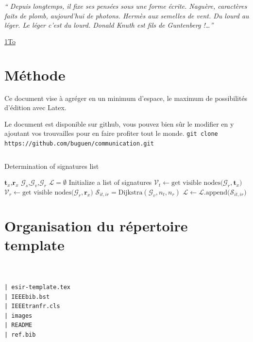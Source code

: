 \documentclass[twocolumn,a4paper]{IEEEtranfr}
\newcommand{\mc}[1]{\mathcal{#1}}
\begin{document}
{\textit
{`` Depuis longtemps, il fixe ses pensées sous une forme écrite.
Naguère, caractères faits de plomb, aujourd'hui de photons. Hermès aux semelles de vent. Du lourd au léger. Le léger c'est du lourd. 
Donald Knuth est fils de Guntenberg !\dots''}

\href{http://micro.lemondeinformatique.fr/nouveaux-produits/lire-datatraveler-hyperx-predator-19600.html}{1To}
\section{Méthode}

Ce document vise à agréger en un minimum d'espace, le maximum de possibilités
d'édition avec Latex.

Le document est disponible sur github,  vous pouvez bien sûr le modifier en y ajoutant
vos trouvailles pour en faire profiter tout le monde.
{\tt git clone https://github.com/buguen/communication.git}
\begin{lstlisting}

\end{lstlisting}

\begin{algorithm}               %
\label{alg1}                           %
\caption{Determination of signatures list}
\begin{algorithmic}                    %
\REQUIRE $\mathbf{t}_x$,$\mathbf{r}_x$
\REQUIRE $\mc{G}_s$,$\mc{G}_v$,$\mc{G}_r$
\STATE $\mathcal{L} = \emptyset $ Initialize a list of signatures
\STATE $\mathcal{V}_t \leftarrow \textrm{get visible nodes(}\mc{G}_r,\mathbf{t}_x\textrm{)}$
\STATE $\mathcal{V}_r \leftarrow \textrm{get visible nodes(}\mc{G}_r,\mathbf{r}_x\textrm{)}$
\STATE $\mc{S}_{it,ir}  = \textrm{Dijkstra}(\mc{G}_v,n_t,n_r)$
\STATE $\mathcal{L}\leftarrow \mathcal{L}.\textrm{append(}\mc{S}_{it,ir}\textrm{)}$
\ENDFOR
\ENDFOR
\end{algorithmic}
\end{algorithm}

\section{Organisation du répertoire template}

\begin{verbatim}


| esir-template.tex
| IEEEbib.bst
| IEEEtranfr.cls
| images
| README
| ref.bib


\end{verbatim}}
\end{document}

